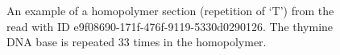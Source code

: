 \begin{figure}
\centering

	\caption[An example of a homopolymer section (repetition of `T') from the read with ID e9f08690-171f-476f-9119-5330d0290126.]{\label{fig:homo-section}An example of a homopolymer section (repetition of `T') from the read with ID e9f08690-171f-476f-9119-5330d0290126. The thymine DNA base is repeated 33 times in the homopolymer.}
\end{figure}
